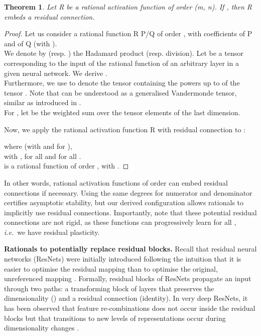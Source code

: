 \documentclass[accepted]{article}
\theoremstyle{plain}
\newtheorem{theorem}{Theorem}[section]
\theoremstyle{definition}
\theoremstyle{remark}
\newcommand{\ie}{\emph{i.e.}~}
\begin{document}
\begin{theorem}
\label{thm:bigtheorem}
Let R be a rational activation function of order (m, n). If , then R embeds a residual connection.
\end{theorem}
\begin{proof} 
Let us consider a rational function R  P/Q of order , with coefficients  of P and  of Q (with ). \\
We denote by  (resp. ) the Hadamard product (resp. division). Let  be a tensor corresponding to the input of the rational function of an arbitrary layer in a given neural network. We derive \hspace{0pt} . \\ 
Furthermore, we use  to denote the tensor containing the powers up to  of the tensor . Note that  can be understood as a generalised Vandermonde tensor, similar as introduced in \citep{xu2016generalized}. \\
For , let  be the weighted sum over the tensor elements of the last dimension.

Now, we apply the rational activation function R with residual connection to :

where  (with  and  for ),\\
 with ,   for all  and  for all . \\
 is a rational function of order ,  with . 
\end{proof}
In other words, rational activation functions of order  can embed residual connections if necessary. Using the same degrees for numerator and denominator certifies asymptotic stability, but our derived configuration allows rationals to implicitly use residual connections.
Importantly, note that these potential residual connections are not rigid, as these functions can progressively learn  for all , \ie we have residual plasticity.

\textbf{Rationals to potentially replace residual blocks.} 
Recall that residual neural networks (ResNets) were initially introduced following the intuition that it is easier to optimise the residual mapping than to optimise the original, unreferenced mapping \citep{HeZRS16}. 
Formally, residual blocks of ResNets propagate an input  through two paths: a transforming block of layers that preserves the dimensionality () and a residual connection (identity). 
In very deep ResNets, it has been observed that feature re-combinations does not occur inside the residual blocks but that transitions to new levels of representations occur during dimensionality changes \cite{VeitWB16, greff2016highway}. 
\end{document}
